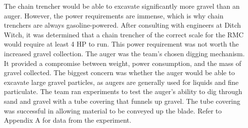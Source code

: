 \documentclass[class=article, crop=false]{standalone}
\begin{document}
The chain trencher would be able to excavate significantly more gravel than an auger. However, the power requirements are immense, which is why chain trenchers are always gasoline-powered. After consulting with engineers at Ditch Witch, it was determined that a chain trencher of the correct scale for the RMC would require at least 4 HP to run. This power requirement was not worth the increased gravel collection. 
The auger was the team’s chosen digging mechanism. It provided a compromise between weight, power consumption, and the mass of gravel collected. The biggest concern was whether the auger would be able to excavate large gravel particles, as augers are generally used for liquids and fine particulate. The team ran experiments to test the auger’s ability to dig through sand and gravel with a tube covering that funnels up gravel. The tube covering was successful in allowing material to be conveyed up the blade. Refer to Appendix A for data from the experiment.


	
	
	


	
\end{document}
